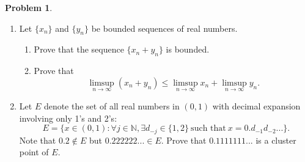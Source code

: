 \documentclass[12pt]{article}
\theoremstyle{definition}
\newtheorem{problem}{Problem}
\begin{document}
\begin{problem}
    \hfill
    \begin{enumerate}[label=(\alph*)]
        \item Let \(\{x_n\}\) and \(\{y_n\}\) be bounded sequences of real numbers.
        \begin{enumerate}[label=(\roman*)]
            \item Prove that the sequence \(\{x_n + y_n\}\) is bounded.
            \item Prove that
            \[
                \limsup_{n \to \infty}(x_n + y_n) \leq \limsup_{n \to \infty}x_n + \limsup_{n \to \infty}y_n.
            \]
        \end{enumerate}
        \item Let \(E\) denote the set of all real numbers in \((0,1)\) with decimal expansion involving only 1’s and 2’s:
        \[
            E = \{x \in (0,1) : \forall j \in \mathbb{N}, \exists d_{-j} \in \{1, 2\} \ \text{such that} \ x = 0.d_{-1}d_{-2} ...\}.
        \]
        Note that \(0.2 \not \in E\) but \(0.222222... \in E\). Prove that \(0.1111111...\) is a cluster point of \(E\).
    \end{enumerate}
\end{problem}
\end{document}

